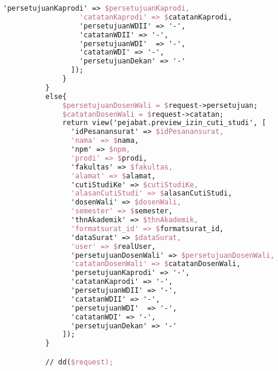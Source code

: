 \begin{lstlisting}[language=tex,basicstyle=\tiny,caption=PesanansuratController.php]
                  'persetujuanKaprodi' => $persetujuanKaprodi,
                  'catatanKaprodi' => $catatanKaprodi,
                  'persetujuanWDII' => '-',
                  'catatanWDII' => '-',
                  'persetujuanWDI'  => '-',
                  'catatanWDI' => '-',
                  'persetujuanDekan' => '-'
                ]);
              }
          }
          else{
              $persetujuanDosenWali = $request->persetujuan;
              $catatanDosenWali = $request->catatan;
              return view('pejabat.preview_izin_cuti_studi', [
                'idPesanansurat' => $idPesanansurat,
                'nama' => $nama,
                'npm' => $npm,
                'prodi' => $prodi,
                'fakultas' => $fakultas,
                'alamat' => $alamat,
                'cutiStudiKe' => $cutiStudiKe,
                'alasanCutiStudi' => $alasanCutiStudi,
                'dosenWali' => $dosenWali,
                'semester' => $semester,
                'thnAkademik' => $thnAkademik,
                'formatsurat_id' => $formatsurat_id,
                'dataSurat' => $dataSurat,
                'user' => $realUser,
                'persetujuanDosenWali' => $persetujuanDosenWali,
                'catatanDosenWali' => $catatanDosenWali,
                'persetujuanKaprodi' => '-',
                'catatanKaprodi' => '-',
                'persetujuanWDII' => '-',
                'catatanWDII' => '-',
                'persetujuanWDI'  => '-',
                'catatanWDI' => '-',
                'persetujuanDekan' => '-'
              ]);
          }

          // dd($request);


\end{lstlisting}
